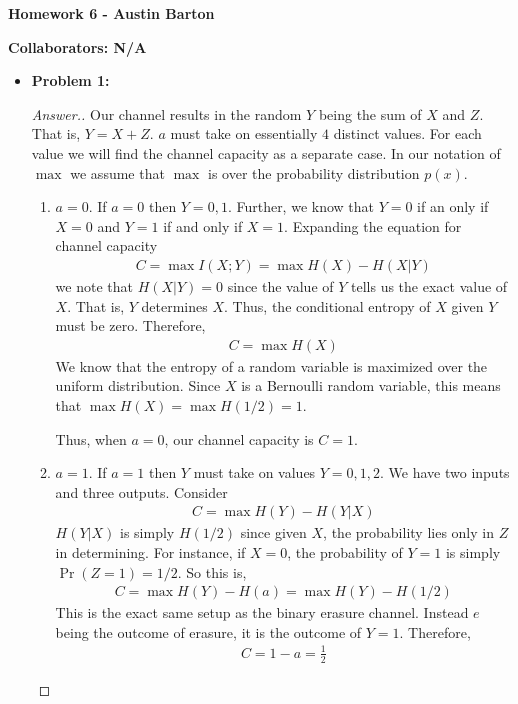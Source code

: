 \documentclass[10pt,twoside]{article}
\begin{document}
\begin{center}
\huge{\bf{Homework 6} - Austin Barton}
\end{center}

\medskip

\noindent \large{\textbf{Collaborators: N/A}}

\medskip

\begin{itemize}
    \item\textbf{Problem 1:} \newline
    \noindent\makebox[\linewidth]{\rule{18cm}{0.4pt}}
    \begin{proof}[Answer.] 
    Our channel results in the random $Y$ being the sum of $X$ and $Z$. That is, $Y = X + Z$. $a$ must take on essentially $4$ distinct values. For each value we will find the channel capacity as a separate case. In our notation of $\max$ we assume that $\max$ is over the probability distribution $p(x)$.

    \begin{enumerate}
        \item $a = 0$. If $a = 0$ then $Y = 0,1$. Further, we know that $Y = 0$ if an only if $X = 0$ and $Y = 1$ if and only if $X = 1$. Expanding the equation for channel capacity
        \begin{gather*}
            C = \max I(X;Y) = \max H(X) - H(X|Y)
        \end{gather*}
        we note that $H(X|Y) = 0$ since the value of $Y$ tells us the exact value of $X$. That is, $Y$ determines $X$. Thus, the conditional entropy of $X$ given $Y$ must be zero. Therefore, 
        \begin{gather*}
            C = \max H(X)
        \end{gather*}
        We know that the entropy of a random variable is maximized over the uniform distribution. Since $X$ is a Bernoulli random variable, this means that $\max H(X) = \max H(1/2) = 1$.

        Thus, when $a=0$, our channel capacity is $C = 1$.

        \item $a = 1$. If $a = 1$ then $Y$ must take on values $Y = 0, 1, 2$. We have two inputs and three outputs. Consider
        \begin{gather*}
            C = \max H(Y) - H(Y|X)
        \end{gather*}
        $H(Y|X)$ is simply $H(1/2)$ since given $X$, the probability lies only in $Z$ in determining. For instance, if $X = 0$, the probability of $Y = 1$ is simply $\Pr(Z = 1) = 1/2$. So this is,
        \begin{gather*}
            C = \max H(Y) - H(a) = \max H(Y) - H(1/2)
        \end{gather*}
        This is the exact same setup as the binary erasure channel. Instead $e$ being the outcome of erasure, it is the outcome of $Y = 1$. Therefore, 
        \begin{gather*}
            C = 1 - a = \frac{1}{2}
        \end{gather*}


\end{enumerate}
\end{proof}
\end{itemize}
\end{document}

